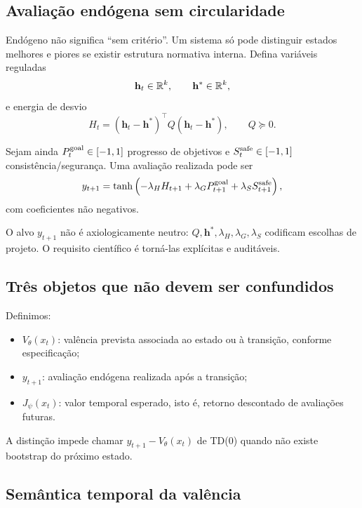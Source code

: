 \subsection{Avaliação endógena sem circularidade}

Endógeno não significa ``sem critério''. Um sistema só pode distinguir estados melhores e piores se existir estrutura normativa interna. Defina variáveis reguladas
\begin{equation}
\mathbf h_t\in\mathbb{R}^k,
\qquad \mathbf h^*\in\mathbb{R}^k,
\end{equation}
e energia de desvio
\begin{equation}
H_t=(\mathbf h_t-\mathbf h^*)^\top Q(\mathbf h_t-\mathbf h^*),
\qquad Q\succeq0.
\label{eq:homeostatic_energy}
\end{equation}

Sejam ainda \(P_t^{\rm goal}\in[-1,1]\) progresso de objetivos e \(S_t^{\rm safe}\in[-1,1]\) consistência/segurança. Uma avaliação realizada pode ser
\begin{equation}
y_{t+1}=\tanh\left(
-\lambda_H H_{t+1}
+\lambda_G P_{t+1}^{\rm goal}
+\lambda_S S_{t+1}^{\rm safe}
\right),
\label{eq:endogenous_target}
\end{equation}
com coeficientes não negativos.

O alvo \(y_{t+1}\) não é axiologicamente neutro: \(Q,\mathbf h^*,\lambda_H,\lambda_G,\lambda_S\) codificam escolhas de projeto. O requisito científico é torná-las explícitas e auditáveis.

\subsection{Três objetos que não devem ser confundidos}

Definimos:
\begin{itemize}
\item \(V_\theta(x_t)\): valência prevista associada ao estado ou à transição, conforme especificação;
\item \(y_{t+1}\): avaliação endógena realizada após a transição;
\item \(J_\psi(x_t)\): valor temporal esperado, isto é, retorno descontado de avaliações futuras.
\end{itemize}

A distinção impede chamar \(y_{t+1}-V_\theta(x_t)\) de TD(0) quando não existe bootstrap do próximo estado.

\subsection{Semântica temporal da valência}

